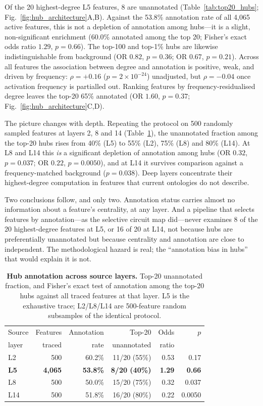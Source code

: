 \documentclass[11pt,onecolumn]{article}
\begin{document}
Of the 20 highest-degree L5 features, 8 are unannotated (Table~\ref{tab:top20_hubs}; Fig.~\ref{fig:hub_architecture}A,B). Against the 53.8\% annotation rate of all 4{,}065 active features, this is not a depletion of annotation among hubs---it is a slight, non-significant enrichment (60.0\% annotated among the top 20; Fisher's exact odds ratio $1.29$, $p=0.66$). The top-100 and top-1\% hubs are likewise indistinguishable from background (OR $0.82$, $p=0.36$; OR $0.67$, $p=0.21$). Across all features the association between degree and annotation is positive, weak, and driven by frequency: $\rho=+0.16$ ($p=2\times10^{-24}$) unadjusted, but $\rho=-0.04$ once activation frequency is partialled out. Ranking features by frequency-residualised degree leaves the top-20 65\% annotated (OR $1.60$, $p=0.37$; Fig.~\ref{fig:hub_architecture}C,D).

The picture changes with depth. Repeating the protocol on 500 randomly sampled features at layers 2, 8 and 14 (Table~\ref{tab:layers}), the unannotated fraction among the top-20 hubs rises from 40\% (L5) to 55\% (L2), 75\% (L8) and 80\% (L14). At L8 and L14 this \emph{is} a significant depletion of annotation among hubs (OR $0.32$, $p=0.037$; OR $0.22$, $p=0.0050$), and at L14 it survives comparison against a frequency-matched background ($p=0.038$). Deep layers concentrate their highest-degree computation in features that current ontologies do not describe.

Two conclusions follow, and only two. Annotation status carries almost no information about a feature's centrality, at any layer. And a pipeline that selects features by annotation---as the selective circuit map did---never examines 8 of the 20 highest-degree features at L5, or 16 of 20 at L14, not because hubs are preferentially unannotated but because centrality and annotation are close to independent. The methodological hazard is real; the ``annotation bias in hubs'' that would explain it is not.

\begin{table}[t!]
\centering
\caption{{\bf Hub annotation across source layers.} Top-20 unannotated fraction, and Fisher's exact test of annotation among the top-20 hubs against all traced features at that layer. L5 is the exhaustive trace; L2/L8/L14 are 500-feature random subsamples of the identical protocol.}
\label{tab:layers}
\small
\begin{tabular}{lrrrrr}
\toprule
Source & Features & Annotation & Top-20 & Odds & $p$ \\
layer & traced & rate & unannotated & ratio & \\
\midrule
L2  & 500 & 60.2\% & 11/20 (55\%) & 0.53 & 0.17 \\
\textbf{L5} & \textbf{4{,}065} & \textbf{53.8\%} & \textbf{8/20 (40\%)} & \textbf{1.29} & \textbf{0.66} \\
L8  & 500 & 50.0\% & 15/20 (75\%) & 0.32 & 0.037 \\
L14 & 500 & 51.8\% & 16/20 (80\%) & 0.22 & 0.0050 \\
\bottomrule
\end{tabular}
\end{table}
\end{document}
